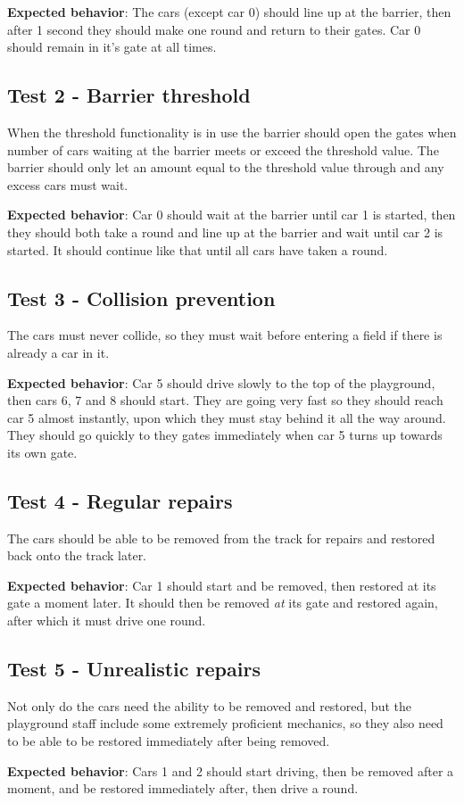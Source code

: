 \textbf{Expected behavior}: The cars (except car 0) should line up at the barrier, then after 1 second they should make one round and return to their gates. Car 0 should remain in it's gate at all times.

\subsection{Test 2 - Barrier threshold}
When the threshold functionality is in use the barrier should open the gates when number of cars waiting at the barrier meets or exceed the threshold value. The barrier should only let an amount equal to the threshold value through and any excess cars must wait.

\textbf{Expected behavior}: Car 0 should wait at the barrier until car 1 is started, then they should both take a round and line up at the barrier and wait until car 2 is started. It should continue like that until all cars have taken a round.

\subsection{Test 3 - Collision prevention}
The cars must never collide, so they must wait before entering a field if there is already a car in it.

\textbf{Expected behavior}: Car 5 should drive slowly to the top of the playground, then cars 6, 7 and 8 should start. They are going very fast so they should reach car 5 almost instantly, upon which they must stay behind it all the way around. They should go quickly to they gates immediately when car 5 turns up towards its own gate.

\subsection{Test 4 - Regular repairs}
The cars should be able to be removed from the track for repairs and restored back onto the track later.

\textbf{Expected behavior}: Car 1 should start and be removed, then restored at its gate a moment later. It should then be removed \emph{at} its gate and restored again, after which it must drive one round.

\subsection{Test 5 - Unrealistic repairs}
Not only do the cars need the ability to be removed and restored, but the playground staff include some extremely proficient mechanics, so they also need to be able to be restored immediately after being removed.

\textbf{Expected behavior}: Cars 1 and 2 should start driving, then be removed after a moment, and be restored immediately after, then drive a round.

